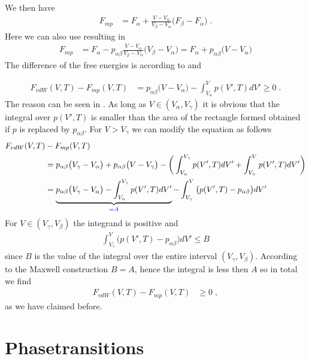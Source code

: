 %
We then have
%
\begin{align}\label{eq:F:mp:a}
F_{mp} &= 
 F_{\alpha} + \frac{V-V_{\alpha}}{V_{\beta}-V_{\alpha}} \big(F_{\beta}-F_{\alpha}\big)\;.
\end{align}
%
Here we can also use  resulting in
\begin{align}
F_{mp} &= 
 F_{\alpha}-p_{\alpha\beta} \frac{V-V_{\alpha}}{V_{\beta}-V_{\alpha}} \big(V_{\beta}-V_{\alpha}\big)
 =
 F_{\alpha}+p_{\alpha\beta} \big(V-V_{\alpha}\big)
\label{eq:F:mp}
\end{align}
The difference of the free energies is according to  and 


%
\begin{align*}
F_{vdW}(V,T) - F_{mp}(V,T) &= 
p_{\alpha\beta} \big(V-V_{\alpha}\big) 
- \int_{V_{\alpha}}^{V} p(V',T) dV'  \ge 0 \;.
\end{align*}
%
The reason can be seen in . As long as $V\in(V_{\alpha},V_{\gamma})$
it is obvious that the integral over $p(V',T)$ is smaller than the area of the rectangle formed
obtained if $p$ is replaced by $p_{\alpha\beta}$. For $V> V_{\gamma}$ we can modify the equation as follows
\begin{align*}
F_{vdW}(V,T) &- F_{mp}(V,T)  \\
&=p_{\alpha\beta} \big(V_{\gamma}-V_{\alpha}\big) +
p_{\alpha\beta} \big(V-V_{\gamma}\big) 
- \bigg( \int_{V_{\alpha}}^{V_{\gamma}} p(V',T) dV'  + \int_{V_{\gamma}}^{V} p(V',T) dV' \bigg)\\
&= \underbrace{
p_{\alpha\beta} \big(V_{\gamma}-V_{\alpha}\big) -\int_{V_{\alpha}}^{V_{\gamma}} 
p(V',T) dV'}_{\color{blue} = A}
-     \int_{V_{\gamma}}^{V} \big(p(V',T)-p_{\alpha\beta}\big) dV'\\
\end{align*}
%
For $V \in (V_{\gamma},V_{\beta})$ the integrand  is positive and 
%
\begin{align*}
\int_{V_{\gamma}}^{V} \big(p(V',T)-p_{\alpha\beta}\big) dV' \le B
\end{align*}
%
since $B$ is the value of the integral over the entire interval $(V_{\gamma},V_{\beta})$.
According to the Maxwell construction $B=A$, hence the integral is less then $A$ so in total we find
\begin{align*}
F_{vdW}(V,T) - F_{mp}(V,T)  &\ge 0\;,
\end{align*}
%
as we have claimed before.

\section{Phasetransitions}


